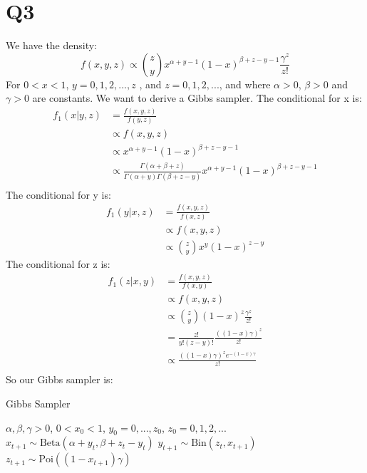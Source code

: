 \documentclass{article}
\begin{document}
\section*{Q3}
We have the density:
$$f(x, y, z)\propto {z\choose y}x^{\alpha+y-1}(1-x)^{\beta+z-y-1}\frac{\gamma^z}{z!}$$
For $0<x<1$, $y=0,1,2,...,z$ , and $z=0,1,2,...$, and where $\alpha>0$, $\beta >0$ and $\gamma>0$ are constants.
\newline\newline
We want to derive a Gibbs sampler.
\newline\newline
The conditional for x is:
\begin{align*}
f_1(x|y,z)&=\frac{f(x,y,z)}{f(y,z)}\\
&\propto f(x,y,z)\\
&\propto x^{\alpha+y-1}(1-x)^{\beta+z-y-1}\\
&\propto \frac{\Gamma(\alpha+\beta+z)}{\Gamma(\alpha+y)\Gamma(\beta+z-y)}x^{\alpha+y-1}(1-x)^{\beta+z-y-1}\\
\end{align*}
The conditional for y is:
\begin{align*}
f_1(y|x,z)&=\frac{f(x,y,z)}{f(x,z)}\\
&\propto f(x,y,z)\\
&\propto {z \choose y}x^y(1-x)^{z-y}
\end{align*}
The conditional for z is:
\begin{align*}
f_1(z|x,y)&=\frac{f(x,y,z)}{f(x,y)}\\
&\propto f(x,y,z)\\
&\propto {z\choose y}(1-x)^z\frac{\gamma^z}{z!}\\
&=\frac{z!}{y!(z-y)!}\frac{((1-x)\gamma)^z}{z!}\\
&\propto \frac{((1-x)\gamma)^ze^{-(1-x)\gamma}}{z!}\\
\end{align*}
So our Gibbs sampler is:
\begin{algorithm}
\caption{Gibbs Sampler}\label{alg:cap}
\begin{algorithmic}
\Require $\alpha,\beta,\gamma > 0$, $0<x_0<1$, $y_0=0,...,z_0$, $z_0=0,1,2,...$
\State $x_{t+1}\sim\text{Beta}(\alpha+y_t,\beta+z_t-y_t)$
\State $y_{t+1}\sim\text{Bin}(z_t,x_{t+1})$
\State $z_{t+1}\sim\text{Poi}((1-x_{t+1})\gamma)$
\end{algorithmic}
\end{algorithm}
\end{document}
